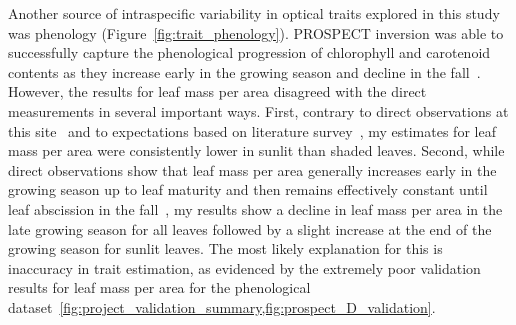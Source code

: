 Another source of intraspecific variability in optical traits explored in this study was phenology (Figure~\ref{fig:trait_phenology}).
PROSPECT inversion was able to successfully capture the phenological progression of chlorophyll and carotenoid contents as they increase early in the growing season and decline in the fall~\cite{yang_2014_beyond,yang_2016_seasonal}.
However, the results for leaf mass per area disagreed with the direct measurements in several important ways.
First, contrary to direct observations at this site~\cite{yang_2016_seasonal} and to expectations based on literature survey~\cite{poorter_2009_causes}, my estimates for leaf mass per area were consistently lower in sunlit than shaded leaves.
Second, while direct observations show that leaf mass per area generally increases early in the growing season up to leaf maturity and then remains effectively constant until leaf abscission in the fall~\cite{yang_2014_beyond,yang_2016_seasonal},
my results show a decline in leaf mass per area in the late growing season for all leaves followed by a slight increase at the end of the growing season for sunlit leaves.
The most likely explanation for this is inaccuracy in trait estimation, as evidenced by the extremely poor validation results for leaf mass per area for the phenological dataset~\ref{fig:project_validation_summary,fig:prospect_D_validation}.

